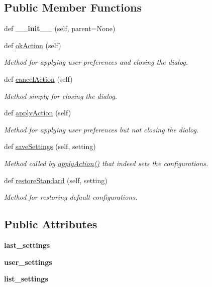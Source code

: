 \subsection*{Public Member Functions}
\begin{DoxyCompactItemize}
\item 
\hypertarget{a00103_af773a0c74e666c299d2334a21966f8c9}{}\label{a00103_af773a0c74e666c299d2334a21966f8c9} 
def {\bfseries \+\_\+\+\_\+init\+\_\+\+\_\+} (self, parent=None)
\item 
def \hyperlink{a00103_a7e99113696fefa62dfdeb2ba1279350c}{ok\+Action} (self)
\begin{DoxyCompactList}\small\item\em Method for applying user preferences and closing the dialog. \end{DoxyCompactList}\item 
def \hyperlink{a00103_af92de31fcc110a9892dc2914efb6b46f}{cancel\+Action} (self)
\begin{DoxyCompactList}\small\item\em Method simply for closing the dialog. \end{DoxyCompactList}\item 
def \hyperlink{a00103_a8938a7b43ca7c5496a0ae7bf8d6a0c54}{apply\+Action} (self)
\begin{DoxyCompactList}\small\item\em Method for applying user preferences but not closing the dialog. \end{DoxyCompactList}\item 
def \hyperlink{a00103_a9cfbfd7abab4ba14d80c573a0534040b}{save\+Settings} (self, setting)
\begin{DoxyCompactList}\small\item\em Method called by \hyperlink{a00103_a8938a7b43ca7c5496a0ae7bf8d6a0c54}{apply\+Action()} that indeed sets the configurations. \end{DoxyCompactList}\item 
def \hyperlink{a00103_ab74be9049535f502252efb2df560ac8e}{restore\+Standard} (self, setting)
\begin{DoxyCompactList}\small\item\em Method for restoring default configurations. \end{DoxyCompactList}\end{DoxyCompactItemize}
\subsection*{Public Attributes}
\begin{DoxyCompactItemize}
\item 
\hypertarget{a00103_a8904394496c57e265ab1cf0346b025d9}{}\label{a00103_a8904394496c57e265ab1cf0346b025d9} 
{\bfseries last\+\_\+settings}
\item 
\hypertarget{a00103_a0a02958126e9787f79af1a0f45fab30c}{}\label{a00103_a0a02958126e9787f79af1a0f45fab30c} 
{\bfseries user\+\_\+settings}
\item 
\hypertarget{a00103_aec84d483efd9155fc73699fe365ac9c2}{}\label{a00103_aec84d483efd9155fc73699fe365ac9c2} 
{\bfseries list\+\_\+settings}
\end{DoxyCompactItemize}


